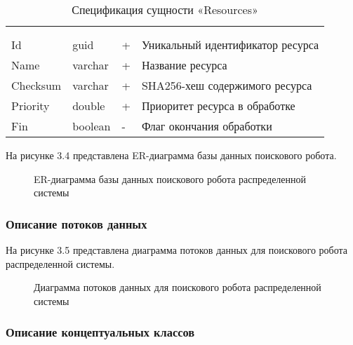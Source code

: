 \begin{xltabular}{\textwidth}{|X|X|X|X|}
	\caption{Спецификация сущности «Resources»}\label{crawler_resources:table}\\ \hline
	 &  &  &  \\ \hline
	 &  &  &  \\ \hline
	\endfirsthead
	 \hline
	 &  &  &  \\ \hline
	\endhead
	Id & guid & + & Уникальный идентификатор ресурса \\ \hline
	Name & varchar & + & Название ресурса \\ \hline
	Checksum & varchar & + & SHA256-хеш содержимого ресурса \\ \hline
	Priority & double & + & Приоритет ресурса в обработке \\ \hline
	Fin & boolean & - & Флаг окончания обработки \\ \hline
\end{xltabular}

На рисунке 3.4 представлена ER-диаграмма базы данных поискового робота.

\begin{figure}[H]
\caption{ER-диаграмма базы данных поискового робота распределенной системы}
\label{robot/robot_db:image}
\end{figure}

\subsubsection{Описание потоков данных}

На рисунке 3.5 представлена диаграмма потоков данных для поискового робота распределенной системы.

\begin{figure}[H]
\caption{Диаграмма потоков данных для поискового робота распределенной системы}
\label{robot/diagram_dataflow:image}
\end{figure}

\subsubsection{Описание концептуальных классов}

